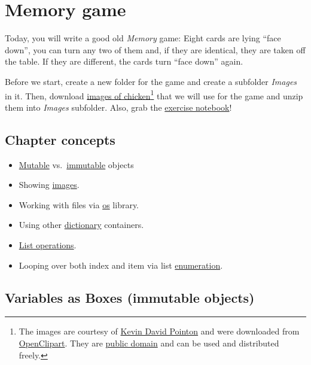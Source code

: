 \documentclass[
]{book}
\providecommand{\tightlist}{%
  \setlength{\itemsep}{0pt}\setlength{\parskip}{0pt}}
\begin{document}
\hypertarget{memory-game}{%
\chapter{Memory game}\label{memory-game}}

Today, you will write a good old \emph{Memory} game: Eight cards are lying ``face down'', you can turn any two of them and, if they are identical, they are taken off the table. If they are different, the cards turn ``face down'' again.

Before we start, create a new folder for the game and create a subfolder \emph{Images} in it. Then, download \href{material/chicken.zip}{images of chicken}\footnote{The images are courtesy of \href{https://openclipart.org/artist/Firkin}{Kevin David Pointon} and were downloaded
  from \href{https://openclipart.org/}{OpenClipart}. They are \href{https://creativecommons.org/publicdomain/zero/1.0/}{public domain} and can be used and distributed freely.} that we will use for the game and unzip them into \emph{Images} subfolder. Also, grab the \href{notebooks/Memory\%20game.ipynb}{exercise notebook}!

\hypertarget{chapter-concepts-5}{%
\section{Chapter concepts}\label{chapter-concepts-5}}

\begin{itemize}
\tightlist
\item
  \protect\hyperlink{mutable-objects}{Mutable} vs.~\protect\hyperlink{variables-as-boxes-immutable-objects}{immutable} objects
\item
  Showing \protect\hyperlink{imagestim}{images}.
\item
  Working with files via \protect\hyperlink{os-library}{os} library.
\item
  Using other \protect\hyperlink{dictionaries}{dictionary} containers.
\item
  \protect\hyperlink{list-operations}{List operations}.
\item
  Looping over both index and item via list \protect\hyperlink{enumerate}{enumeration}.
\end{itemize}

\hypertarget{variables-as-boxes-immutable-objects}{%
\section{Variables as Boxes (immutable objects)}\label{variables-as-boxes-immutable-objects}}
\end{document}

